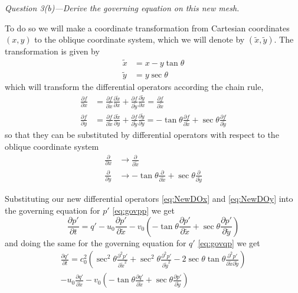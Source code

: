 \documentclass[11pt]{article}
\begin{document}
\begin{tcolorbox}
  \textit{Question 3(b)---Derive the governing equation on this new mesh.}
\end{tcolorbox}
To do so we will make a coordinate transformation from Cartesian coordinates $(x,y)$ to the oblique coordinate system, which we will denote by $(\tilde{x}, \tilde{y})$. The transformation is given by
\begin{subequations}
\begin{align}
  \tilde{x} &= x - y\tan\theta \\
  \tilde{y} &= y\sec\theta
\end{align}
\end{subequations}
which will transform the differential operators according the chain rule,
\begin{align*}
  \frac{\partial f}{\partial x} &= \frac{\partial f}{\partial \tilde{x}} \frac{\partial \tilde{x}}{\partial x}
  + \frac{\partial f}{\partial \tilde{y}} \frac{\partial \tilde{y}}{\partial x} = \frac{\partial f}{\partial \tilde{x}} \\
  \frac{\partial f}{\partial y} &= \frac{\partial f}{\partial \tilde{x}} \frac{\partial \tilde{x}}{\partial y}
  + \frac{\partial f}{\partial \tilde{y}} \frac{\partial \tilde{y}}{\partial y} = -\tan\theta\frac{\partial f}{\partial \tilde{x}} + \sec\theta \frac{\partial f}{\partial \tilde{y}}
\end{align*}
so that they can be substituted by differential operators with respect to the oblique coordinate system
\begin{subequations}
\begin{align}
  \frac{\partial}{\partial x} &\rightarrow \frac{\partial}{\partial \tilde{x}} \label{eq:NewDOx} \\
  \frac{\partial}{\partial y} &\rightarrow -\tan\theta\frac{\partial}{\partial \tilde{x}} + \sec\theta\frac{\partial}{\partial \tilde{y}} \label{eq:NewDOy}
\end{align}
\end{subequations}

Substituting our new differential operators \eqref{eq:NewDOx} and \eqref{eq:NewDOy} into the governing equation for $p'$ \eqref{eq:govpp} we get
\begin{equation} \label{eq:govppTilde}
\frac{\partial p'}{\partial t} = q' - u_0 \frac{\partial p'}{\partial \tilde{x}} - v_0 \left( -\tan\theta \frac{\partial p'}{\partial \tilde{x}} + \sec\theta  \frac{\partial p'}{\partial \tilde{y}} \right)
\end{equation}
and doing the same for the governing equation for $q'$ \eqref{eq:govqp} we get
\begin{multline} \label{eq:govqpTilde}
\frac{\partial q'}{\partial t} =
  c_0^2 \left( \sec^2\theta \frac{\partial^2 p'}{\partial \tilde{x}^2} + \sec^2\theta \frac{\partial^2 p'}{\partial \tilde{y}^2} - 2\sec\theta\tan\theta \frac{\partial^2 p'}{\partial\tilde{x} \partial\tilde{y}} \right) \\
  - u_0 \frac{\partial q'}{\partial \tilde{x}}
  - v_0 \left( -\tan\theta \frac{\partial q'}{\partial \tilde{x}} + \sec\theta \frac{\partial p'}{\partial \tilde{y}} \right)
\end{multline}
\end{document}
